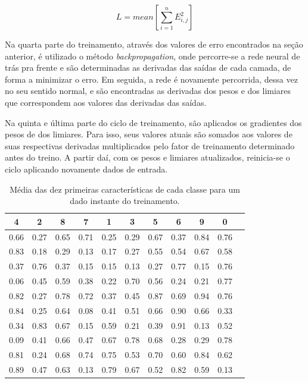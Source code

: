 \documentclass[conference]{IEEEtran}
\begin{document}
\begin{equation}
L = mean \left [ \sum_{i=1}^{n} E_{i,j}^{2} \right ] \label{eqloss}
\end{equation}

Na quarta parte do treinamento, através dos valores de erro encontrados na seção anterior, é utilizado o método \textit{backpropagation}, onde percorre-se a rede neural de trás pra frente e são determinadas as derivadas das saídas de cada camada, de forma a minimizar o erro. Em seguida, a rede é novamente percorrida, dessa vez no seu sentido normal, e são encontradas as derivadas dos pesos e dos limiares que correspondem aos valores das derivadas das saídas.

Na quinta e última parte do ciclo de treinamento, são aplicados os gradientes dos pesos de dos limiares. Para isso, seus valores atuais são somados aos valores de suas respectivas derivadas multiplicados pelo fator de treinamento determinado antes do treino. A partir daí, com os pesos e limiares atualizados, reinicia-se o ciclo aplicando novamente dados de entrada.

\begin{table}[h]
\caption{Média das dez primeiras características de cada classe para um dado instante do treinamento.}
\tabcolsep=0.18cm
\begin{center}
\begin{tabular}{ccccccccccc}
\hline
4 & 2 & 8 & 7 & 1 & 3 & 5 & 6 & 9 & 0 \\ \hline
0.66 & 0.27 & 0.65 & 0.71 & 0.25 & 0.29 & 0.67 & 0.37 & 0.84 & 0.76 \\
0.83 & 0.18 & 0.29 & 0.13 & 0.17 & 0.27 & 0.55 & 0.54 & 0.67 & 0.58 \\
0.37 & 0.76 & 0.37 & 0.15 & 0.15 & 0.13 & 0.27 & 0.77 & 0.15 & 0.76 \\
0.06 & 0.45 & 0.59 & 0.38 & 0.22 & 0.70 & 0.56 & 0.24 & 0.21 & 0.77 \\
0.82 & 0.27 & 0.78 & 0.72 & 0.37 & 0.45 & 0.87 & 0.69 & 0.94 & 0.76 \\
0.84 & 0.25 & 0.64 & 0.08 & 0.41 & 0.51 & 0.66 & 0.90 & 0.66 & 0.33 \\
0.34 & 0.83 & 0.67 & 0.15 & 0.59 & 0.21 & 0.39 & 0.91 & 0.13 & 0.52 \\
0.09 & 0.41 & 0.66 & 0.47 & 0.67 & 0.78 & 0.68 & 0.28 & 0.29 & 0.78 \\
0.81 & 0.24 & 0.68 & 0.74 & 0.75 & 0.53 & 0.70 & 0.60 & 0.84 & 0.62 \\
0.89 & 0.47 & 0.63 & 0.13 & 0.79 & 0.67 & 0.52 & 0.82 & 0.59 & 0.13 \\ \hline
\end{tabular}
\label{tabmean}
\end{center}
\end{table}
\end{document}
